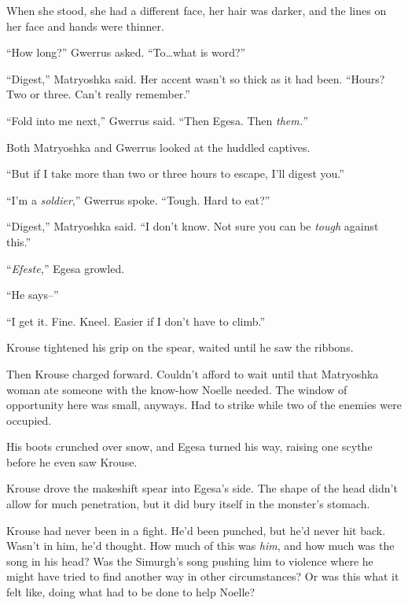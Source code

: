 When she stood, she had a different face, her hair was darker, and the lines on her face and hands were thinner.



``How long?'' Gwerrus asked.  ``To\ldots what is word?''



``Digest,'' Matryoshka said.  Her accent wasn't so thick as it had been.  ``Hours?  Two or three.  Can't really remember.''



``Fold into me next,'' Gwerrus said.  ``Then Egesa.  Then \emph{them.''}



Both Matryoshka and Gwerrus looked at the huddled captives.



``But if I take more than two or three hours to escape, I'll digest you.''



``I'm a \emph{soldier},'' Gwerrus spoke.  ``Tough.  Hard to eat?''



``Digest,'' Matryoshka said.  ``I don't know.  Not sure you can be \emph{tough} against this.''



``\emph{Efeste,}'' Egesa growled.



``He says--''



``I get it.  Fine.  Kneel.  Easier if I don't have to climb.''



Krouse tightened his grip on the spear, waited until he saw the ribbons.



Then Krouse charged forward.  Couldn't afford to wait until that Matryoshka woman ate someone with the know-how Noelle needed.  The window of opportunity here was small, anyways.  Had to strike while two of the enemies were occupied.



His boots crunched over snow, and Egesa turned his way, raising one scythe before he even saw Krouse.



Krouse drove the makeshift spear into Egesa's side.  The shape of the head didn't allow for much penetration, but it did bury itself in the monster's stomach.



Krouse had never been in a fight.  He'd been punched, but he'd never hit back.  Wasn't in him, he'd thought.  How much of this was \emph{him}, and how much was the song in his head?  Was the Simurgh's song pushing him to violence where he might have tried to find another way in other circumstances?  Or was this what it felt like, doing what had to be done to help Noelle?



